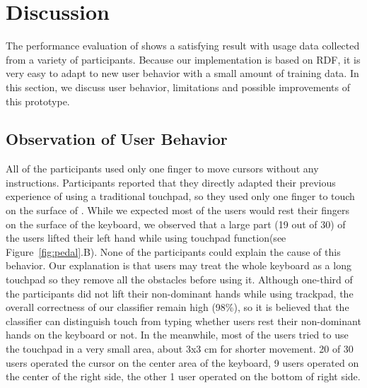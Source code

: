 \section{Discussion}
The performance evaluation of \papertitle\hspace{2pt} shows a satisfying result with usage data collected from a variety of participants.
Because our implementation is based on RDF, it is very easy to adapt to new user behavior with a small amount of training data.
In this section, we discuss user behavior, limitations and possible improvements of this prototype.

\subsection{Observation of User Behavior}
All of the participants used only one finger to move cursors without any instructions.
Participants reported that they directly adapted their previous experience of using a traditional touchpad, so they used only one finger to touch on the surface of \papertitle.
While we expected most of the users would rest their fingers on the surface of the keyboard, we observed that a large part (19 out of 30) of the users lifted their left hand while using touchpad function(see Figure~\ref{fig:pedal}.B).
None of the participants could explain the cause of this behavior. Our explanation is that users may treat the whole keyboard as a long touchpad so they remove all the obstacles before using it.
Although one-third of the participants did not lift their non-dominant hands while using trackpad, the overall correctness of our classifier remain high (98\%), so it is believed that the classifier can distinguish touch from typing whether users rest their non-dominant hands on the keyboard or not.
In the meanwhile, most of the users tried to use the touchpad in a very small area, about 3x3 cm for shorter movement. 
20 of 30 users operated the cursor on the center area of the keyboard, 9 users operated on the center of the right side, the other 1 user operated on the bottom of right side.


